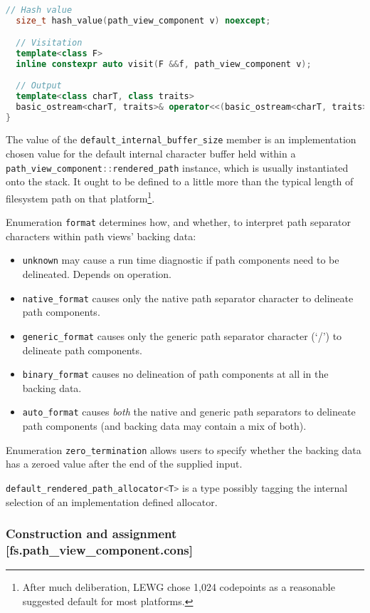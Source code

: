 \documentclass[11pt]{article}
\newcommand{\code}[2][cpp]{\lstinline[language=#1,basicstyle=\small\ttfamily]{#2}}
\begin{document}
\begin{lstlisting}[language=cpp]
  // Hash value
  size_t hash_value(path_view_component v) noexcept;

  // Visitation
  template<class F>
  inline constexpr auto visit(F &&f, path_view_component v);
  
  // Output
  template<class charT, class traits>
  basic_ostream<charT, traits>& operator<<(basic_ostream<charT, traits>& s, path_view_component v);
}
\end{lstlisting}

The value of the \code{default_internal_buffer_size} member is an implementation chosen value for the default internal character buffer held within a \code{path_view_component::rendered_path} instance, which is usually instantiated onto the stack. It ought to be defined to a little more than the typical length of filesystem path on that platform\footnote{After much deliberation, LEWG chose 1,024 codepoints as a reasonable suggested default for most platforms.}.

Enumeration \code{format} determines how, and whether, to interpret path separator characters within path views' backing data:
\begin{itemize}
    \item \code{unknown} may cause a run time diagnostic if path components need to be delineated. Depends on operation.
    \item \code{native_format} causes only the native path separator character to delineate path components.
    \item \code{generic_format} causes only the generic path separator character (`/') to delineate path components.
    \item \code{binary_format} causes no delineation of path components at all in the backing data.
    \item \code{auto_format} causes \emph{both} the native and generic path separators to delineate path components (and backing data may contain a mix of both).
\end{itemize}

Enumeration \code{zero_termination} allows users to specify whether the backing data has a zeroed value after the end of the supplied input.

\code{default_rendered_path_allocator<T>} is a type possibly tagging the internal selection of an implementation defined allocator.

\subsubsection*{Construction and assignment [fs.path\_view\_component.cons]}
\end{document}
